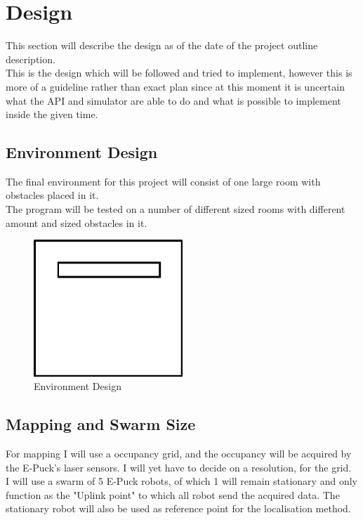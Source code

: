 \chapter{Design}
\label{Design}

This section will describe the design as of the date of the project outline description. \\
This is the design which will be followed and tried to implement, however this is more of a guideline rather than exact plan since at this moment it is uncertain what the  API and simulator are able to do and what is possible to implement inside the given time.\\

\section{Environment Design}
The final environment for this project will consist of one large room with obstacles placed in it. \\
The program will be tested on a number of different sized rooms with different amount and sized obstacles in it.


\begin{figure}[h]
\centering
\includegraphics[width=0.5\textwidth]{../../figures/environment_example2.png} 
\caption{Environment Design}
\label{Figure 2}
\end{figure}

\section{Mapping and Swarm Size}
For mapping I will use a occupancy grid, and the occupancy will be acquired by the E-Puck's laser sensors. 
I will yet have to decide on a resolution, for the grid.\\
I will use a swarm of 5 E-Puck robots, of which 1 will remain stationary and only function as the "Uplink point" to which all robot send the acquired data. 
The stationary robot will also be used as reference point for the localisation method.

